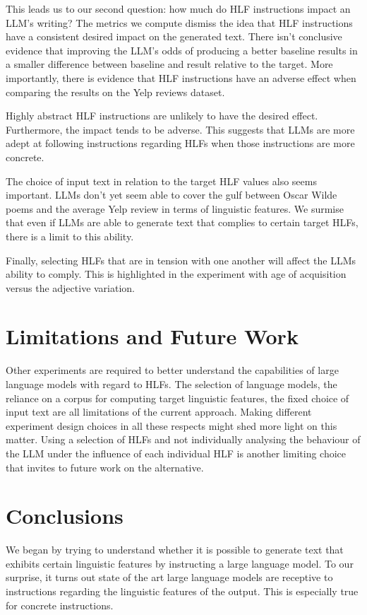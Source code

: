 \documentclass[11pt]{article}
\begin{document}
This leads us to our second question: how much do HLF instructions impact an
LLM's writing?
The metrics we compute dismiss the idea that HLF instructions have a consistent
desired impact on the generated text.
There isn't conclusive evidence that improving the LLM's odds of producing a
better baseline results in a smaller difference between baseline and result
relative to the target.
More importantly, there is evidence that HLF instructions have an adverse effect
when comparing the results on the Yelp reviews dataset.

Highly abstract HLF instructions are unlikely to have the desired effect.
Furthermore, the impact tends to be adverse.
This suggests that LLMs are more adept at following instructions regarding HLFs
when those instructions are more concrete.

The choice of input text in relation to the target HLF values also seems
important.
LLMs don't yet seem able to cover the gulf between Oscar Wilde poems and the
average Yelp review in terms of linguistic features.
We surmise that even if LLMs are able to generate text that complies to certain
target HLFs, there is a limit to this ability.

Finally, selecting HLFs that are in tension with one another will affect the
LLMs ability to comply.
This is highlighted in the experiment with age of acquisition versus the
adjective variation.

\section{Limitations and Future Work}

Other experiments are required to better understand the capabilities of large
language models with regard to HLFs.
The selection of language models, the reliance on a corpus for computing target
linguistic features, the fixed choice of input text are all limitations of the
current approach.
Making different experiment design choices in all these respects might shed more
light on this matter.
Using a selection of HLFs and not individually analysing the behaviour of the
LLM under the influence of each individual HLF is another limiting choice that
invites to future work on the alternative.

\section{Conclusions}

We began by trying to understand whether it is possible to generate text that
exhibits certain linguistic features by instructing a large language model.
To our surprise, it turns out state of the art large language models are
receptive to instructions regarding the linguistic features of the output.
This is especially true for concrete instructions.
\end{document}
